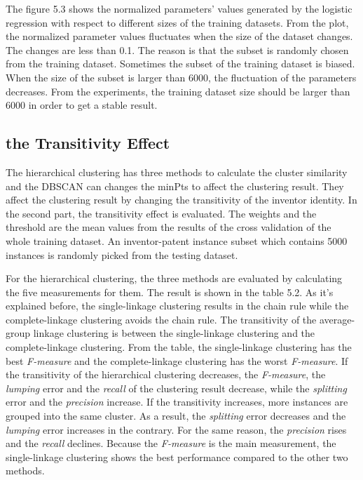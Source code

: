 The figure 5.3 shows the normalized parameters' values generated by the logistic regression with respect to different sizes of the training datasets. From the plot, the normalized parameter values  fluctuates when the size of the dataset changes. The changes are less than 0.1. The reason is that the subset is randomly chosen from the training dataset. Sometimes the subset of the training dataset is biased. When the size of the subset is larger than 6000, the fluctuation of the parameters decreases. From the experiments, the training dataset size should be larger than 6000 in order to get a stable result.

\subsection{the Transitivity Effect}
The hierarchical clustering has three methods to calculate the cluster similarity and the DBSCAN can changes the minPts to affect the clustering result. They affect the clustering result by changing the transitivity of the inventor identity. In the second part, the transitivity effect is evaluated. The weights and the threshold are the mean values from the results of the cross validation of the whole training dataset. An inventor-patent instance subset which contains 5000 instances  is randomly picked from the testing dataset. \newline 

For the hierarchical clustering, the three methods are evaluated by calculating the five measurements for them. The result is shown in the table 5.2. As it's explained before, the single-linkage clustering results in the chain rule while the complete-linkage clustering avoids the chain rule. The transitivity of the average-group linkage clustering is between the single-linkage clustering and the complete-linkage clustering. From the table, the single-linkage clustering has the best \emph{F-measure} and the complete-linkage clustering has the worst \emph{F-measure}.  If the transitivity of the hierarchical clustering decreases, the \emph{F-measure}, the \emph{lumping} error and the \emph{recall} of the clustering result decrease, while the \emph{splitting} error and the \emph{precision} increase. If the transitivity increases, more instances are grouped into the same cluster. As a result, the \emph{splitting} error decreases and the \emph{lumping} error increases in the contrary. For the same reason, the \emph{precision} rises and the \emph{recall} declines. Because the \emph{F-measure} is the main measurement, the single-linkage clustering shows the best performance compared to the other two methods. \newline

